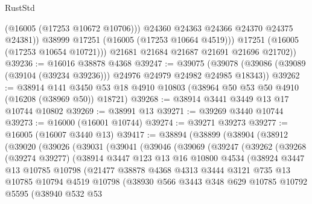 \begin{lexlean}{RustStd}
\begin{coremodule}
                  (@16005 (@17253 @10672 @10706)))
                @24360
                @24363
                @24366
                @24370
                @24375
                @24381))
            @38999
            @17251
            (@16005 (@17253 @10664 @4519)))
          @17251
          (@16005 (@17253 @10654 @10721)))
        @21681
        @21684
        @21687
        @21691
        @21696
        @21702))
@39236 := @16016 @38878 @4368
@39247 := @39075
    (@39078 (@39086 (@39089 (@39104 (@39234 @39236))) @24976 @24979 @24982 @24985 @18343))
@39262 := @38914
    @141
    @3450
    @53
    @18
    @4910
    @10803
    (@38964 @50 @53 @50 @4910 (@16208 (@38969 @50)) @18721)
@39268 := @38914 @3441 @3449 @13 @17 @10744 @10802
@39269 := @38991 @13
@39271 := @39269 @3440 @10744
@39273 := @16000 (@16001 @10744)
@39274 := @39271 @39273
@39277 := @16005 (@16007 @3440 @13)
@39417 := @38894
    (@38899
      (@38904
        (@38912
          (@39020
            (@39026
              (@39031
                (@39041
                  (@39046
                    (@39069
                      (@39247
                        (@39262
                          (@39268
                            (@39274 @39277)
                            (@38914
                              @3447
                              @123
                              @13
                              @16
                              @10800
                              @4534
                              (@38924
                                @3447
                                @13
                                @10785
                                @10798
                                (@21477
                                  @38878
                                  @4368
                                  @4313
                                  @3444
                                  @3121
                                  @735
                                  @13
                                  @10785
                                  @10794
                                  @4519
                                  @10798
                                  (@38930
                                    @566
                                    @3443
                                    @348
                                    @629
                                    @10785
                                    @10792
                                    @5595
                                    (@38940
                                      @532
                                      @53

\end{coremodule}
\end{lexlean}
